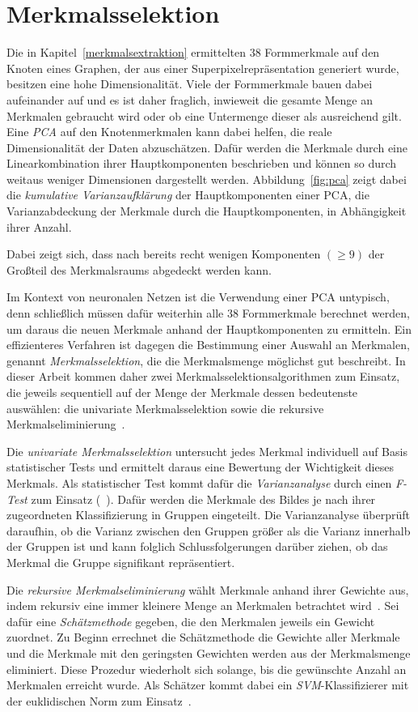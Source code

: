 \section{Merkmalsselektion}
\label{merkmalsselektion}

Die in Kapitel~\ref{merkmalsextraktion} ermittelten $38$ Formmerkmale auf den Knoten eines Graphen, der aus einer Superpixelrepräsentation generiert wurde, besitzen eine hohe Dimensionalität.
Viele der Formmerkmale bauen dabei aufeinander auf und es ist daher fraglich, inwieweit die gesamte Menge an Merkmalen gebraucht wird oder ob eine Untermenge dieser als ausreichend gilt.
Eine \emph{\gls{PCA}} auf den Knotenmerkmalen kann dabei helfen, die reale Dimensionalität der Daten abzuschätzen.
Dafür werden die Merkmale durch eine Linearkombination ihrer Hauptkomponenten beschrieben und können so durch weitaus weniger Dimensionen dargestellt werden.
Abbildung~\ref{fig:pca} zeigt dabei die \emph{kumulative Varianzaufklärung} der Hauptkomponenten einer \gls{PCA}, \dhe{} die Varianzabdeckung der Merkmale durch die Hauptkomponenten, in Abhängigkeit ihrer Anzahl.

Dabei zeigt sich, dass nach bereits recht wenigen Komponenten $\left(\geq 9\right)$ der Großteil des Merkmalsraums abgedeckt werden kann.

Im Kontext von neuronalen Netzen ist die Verwendung einer \gls{PCA} untypisch, denn schließlich müssen dafür weiterhin alle $38$ Formmerkmale berechnet werden, um daraus die neuen Merkmale anhand der Hauptkomponenten zu ermitteln.
Ein effizienteres Verfahren ist dagegen die Bestimmung einer Auswahl an Merkmalen, genannt \emph{Merkmalsselektion}, die die Merkmalsmenge möglichst gut beschreibt.
In dieser Arbeit kommen daher zwei Merkmalsselektionsalgorithmen zum Einsatz, die jeweils sequentiell auf der Menge der Merkmale dessen bedeutenste auswählen: die univariate Merkmalsselektion sowie die rekursive Merkmalseliminierung~\cite{scikitlearn}.

Die \emph{univariate Merkmalsselektion} untersucht jedes Merkmal individuell auf Basis statistischer Tests und ermittelt daraus eine Bewertung der Wichtigkeit dieses Merkmals.
Als statistischer Test kommt dafür die \emph{Varianzanalyse} durch einen \emph{F-Test} zum Einsatz (\vgl{}~\cite{scikitlearn}).
Dafür werden die Merkmale des Bildes je nach ihrer zugeordneten Klassifizierung in Gruppen eingeteilt.
Die Varianzanalyse überprüft daraufhin, ob die Varianz zwischen den Gruppen größer als die Varianz innerhalb der Gruppen ist und kann folglich Schlussfolgerungen darüber ziehen, ob das Merkmal die Gruppe signifikant repräsentiert.

Die \emph{rekursive Merkmalseliminierung} wählt Merkmale anhand ihrer Gewichte aus, indem rekursiv eine immer kleinere Menge an Merkmalen betrachtet wird~\cite{scikitlearn}.
Sei dafür eine \emph{Schätzmethode} gegeben, die den Merkmalen jeweils ein Gewicht zuordnet.
Zu Beginn errechnet die Schätzmethode die Gewichte aller Merkmale und die Merkmale mit den geringsten Gewichten werden aus der Merkmalsmenge eliminiert.
Diese Prozedur wiederholt sich solange, bis die gewünschte Anzahl an Merkmalen erreicht wurde.
Als Schätzer kommt dabei ein \emph{\gls{SVM}}-Klassifizierer mit der euklidischen Norm zum Einsatz~\cite{scikitlearn}.
